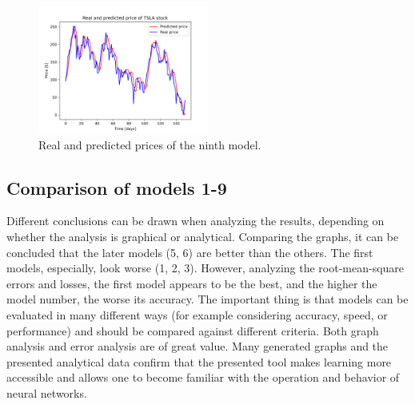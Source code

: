 \begin{figure}
\includegraphics[width=0.5\textwidth]{./graf/model9/TSLA.png}
\caption{Real and predicted prices of the ninth model.}
\label{fig:label}
\end{figure} 

\clearpage
\subsection{Comparison of models 1-9}
Different conclusions can be drawn when analyzing the results, depending on whether the analysis is graphical or analytical. Comparing the graphs, it can be concluded that the later models (5, 6) are better than the others. The first models, especially, look worse (1, 2, 3). However, analyzing the root-mean-square errors and losses, the first model appears to be the best, and the higher the model number, the worse its accuracy.
The important thing is that models can be evaluated in many different ways (for example considering accuracy, speed, or performance) and should be compared against different criteria. Both graph analysis and error analysis are of great value.
Many generated graphs and the presented analytical data confirm that the presented tool makes learning more accessible and allows one to become familiar with the operation and behavior of neural networks.
\clearpage
\setlength\tabcolsep{0pt}

